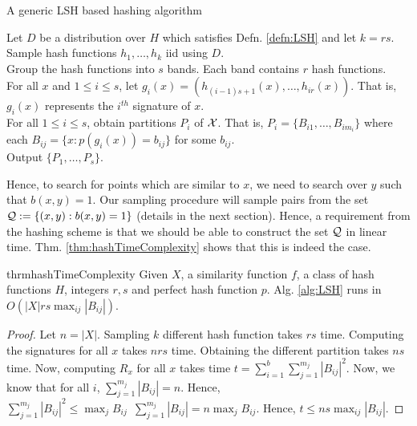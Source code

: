 \begin{algorithm}
\caption{A generic LSH based hashing algorithm \cite{indyk1998approximate,charikar2002similarity}}
\label{alg:LSH}

\Indp{}
\vspace{0.1in} Let $D$ be a distribution over $H$ which satisfies Defn. \ref{defn:LSH} and let $k = r s$.\\
Sample hash functions $h_1, \ldots, h_k$ iid using $D$.\\
 Group the hash functions into $s$ bands. Each band contains $r$ hash functions. \\
For all $x$ and $1\le i \le s$,  let $g_i(x) = (h_{(i-1)s + 1}(x), \ldots, h_{ir}(x))$. That is, $g_i(x)$ represents the $i^{th}$ signature of $x$. \\
For all $1 \le i \le s$, obtain partitions $P_i$ of $\mathcal X$. That is, $P_i = \{B_{i1}, \ldots, B_{im_i}\}$ where each $B_{ij} = \{x : p(g_i(x)) = b_{ij}\}$ for some $b_{ij}$.\\
Output $\{P_1, \ldots, P_s\}$.
\end{algorithm}



Hence, to search for points which are similar to $x$, we need to search over $y$ such that $b(x, y) = 1$. Our sampling procedure will sample pairs from the set $\mathcal Q := \{(x, y) : b(x, y) = 1\}$ (details in the next section). Hence, a requirement from the hashing scheme is that we should be able to construct the set $\mathcal Q$ in linear time. Thm. \ref{thm:hashTimeComplexity} shows that this is indeed the case. 

\begin{restatable}{thrm}{hashTimeComplexity}
\label{thm:hashTimeComplexity}
Given $X$, a similarity function $f$, a class of hash functions $H$, integers $r, s$ and perfect hash function $p$. Alg. \ref{alg:LSH} runs in $O(|X|rs \max_{ij}|B_{ij}|)$.
\end{restatable}
\begin{proof}
Let $n = |X|$. Sampling $k$ different hash function takes $rs$ time. Computing the signatures for all $x$ takes $nrs$ time. Obtaining the different partition takes $ns$ time. Now, computing $R_x$ for all $x$ takes time $t = \sum_{i = 1}^b \sum_{j=1}^{m_j} |B_{ij}|^2$. Now, we know that for all $i$, $\sum_{j=1}^{m_j} |B_{ij}| = n$. Hence, $\sum_{j=1}^{m_j} |B_{ij}|^2 \le \max_j B_{ij} \enspace \sum_{j=1}^{m_j} |B_{ij}| = n \max_j{B_{ij}}$. Hence, $t \le n s \max_{ij} |B_{ij}|$.  
\end{proof}

